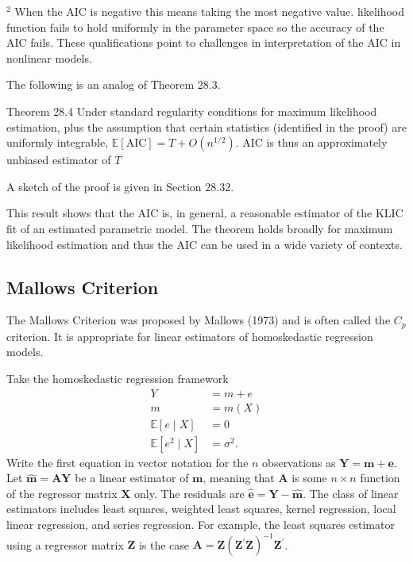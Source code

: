 \documentclass[10pt]{article}
\begin{document}
${ }^{2}$ When the AIC is negative this means taking the most negative value. likelihood function fails to hold uniformly in the parameter space so the accuracy of the AIC fails. These qualifications point to challenges in interpretation of the AIC in nonlinear models.

The following is an analog of Theorem 28.3.

Theorem 28.4 Under standard regularity conditions for maximum likelihood estimation, plus the assumption that certain statistics (identified in the proof) are uniformly integrable, $\mathbb{E}[\mathrm{AIC}]=T+O\left(n^{1 / 2}\right)$. AIC is thus an approximately unbiased estimator of $T$

A sketch of the proof is given in Section $28.32$.

This result shows that the AIC is, in general, a reasonable estimator of the KLIC fit of an estimated parametric model. The theorem holds broadly for maximum likelihood estimation and thus the AIC can be used in a wide variety of contexts.

\subsection{Mallows Criterion}
The Mallows Criterion was proposed by Mallows (1973) and is often called the $C_{p}$ criterion. It is appropriate for linear estimators of homoskedastic regression models.

Take the homoskedastic regression framework
$$
\begin{aligned}
Y &=m+e \\
m &=m(X) \\
\mathbb{E}[e \mid X] &=0 \\
\mathbb{E}\left[e^{2} \mid X\right] &=\sigma^{2} .
\end{aligned}
$$
Write the first equation in vector notation for the $n$ observations as $\boldsymbol{Y}=\boldsymbol{m}+\boldsymbol{e}$. Let $\widehat{\boldsymbol{m}}=\boldsymbol{A} \boldsymbol{Y}$ be a linear estimator of $\boldsymbol{m}$, meaning that $\boldsymbol{A}$ is some $n \times n$ function of the regressor matrix $\boldsymbol{X}$ only. The residuals are $\widehat{\boldsymbol{e}}=\boldsymbol{Y}-\widehat{\boldsymbol{m}}$. The class of linear estimators includes least squares, weighted least squares, kernel regression, local linear regression, and series regression. For example, the least squares estimator using a regressor matrix $\boldsymbol{Z}$ is the case $\boldsymbol{A}=\boldsymbol{Z}\left(\boldsymbol{Z}^{\prime} \boldsymbol{Z}\right)^{-1} \boldsymbol{Z}^{\prime}$.
\end{document}
